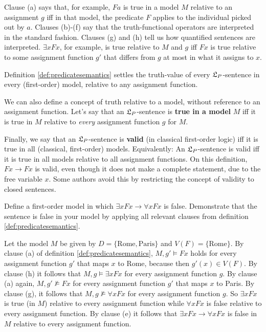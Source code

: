 Clause (a) says that, for example, $Fa$ is true in a model $M$ relative to an
assignment $g$ iff in that model, the predicate $F$ applies to the individual
picked out by $a$. Clauses (b)-(f) say that the truth-functional operators are
interpreted in the standard fashion. Clauses (g) and (h) tell us how quantified
sentences are interpreted. $\exists x Fx$, for example, is true relative to $M$
and $g$ iff $Fx$ is true relative to some assignment function $g'$ that differs
from $g$ at most in what it assigns to $x$.

Definition \ref{def:predicatesemantics} settles the truth-value of every
$\mathfrak{L}_P$-sentence in every (first-order) model, relative to any assignment
function.

We can also define a concept of truth relative to a model, without reference to
an assignment function. Let's say that an $\mathfrak{L}_P$-sentence is \textbf{true in a
  model} $M$ iff it is true in $M$ relative to \emph{every} assignment function
$g$ for $M$.

Finally, we say that an $\mathfrak{L}_P$-sentence is \textbf{valid} (in classical
first-order logic) iff it is true in all (classical, first-order) models.
Equivalently: An $\mathfrak{L}_P$-sentence is valid iff it is true in all models relative
to all assignment functions. On this definition, $Fx \to Fx$ is valid, even
though it does not make a complete statement, due to the free variable $x$. Some
authors avoid this by restricting the concept of validity to closed sentences.


\begin{exercise}
  Define a first-order model in which $\exists x Fx \to \forall x Fx$ is
  false. Demonstrate that the sentence is false in your model by applying all
  relevant clauses from definition \ref{def:predicatesemantics}.
\end{exercise}
\begin{solution}
  Let the model $M$ be given by $D = \{ \text{Rome}, \text{Paris} \}$ and
  $V(F) = \{ \text{Rome} \}$. By clause (a) of definition
  \ref{def:predicatesemantics}, $M,g' \models Fx$ holds for every assignment
  function $g'$ that maps $x$ to Rome, because then $g'(x) \in V(F)$. By clause
  (h) it follows that $M,g \models \exists x Fx$ for every assignment function
  $g$. By clause (a) again, $M, g' \not\models Fx$ for every assignment function
  $g'$ that maps $x$ to Paris. By clause (g), it follows that
  $M,g \not\models \forall x Fx$ for every assignment function $g$. So
  $\exists x Fx$ is true (in $M$) relative to every assignment function while
  $\forall x Fx$ is false relative to every assignment function. By clause (e)
  it follows that $\exists x Fx \to \forall x Fx$ is false in $M$ relative to
  every assignment function.
\end{solution}

